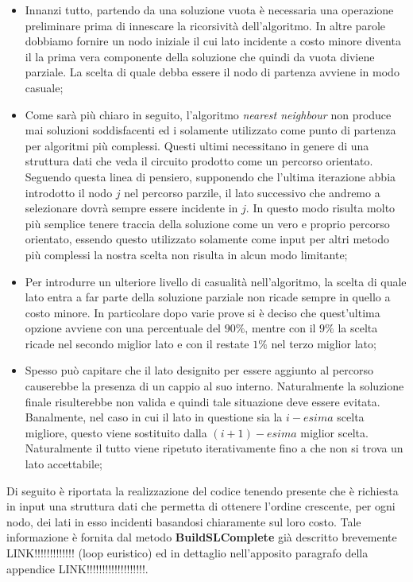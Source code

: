 \documentclass[11pt]{article}
\begin{document}
\begin{itemize}
    \item Innanzi tutto, partendo da una soluzione vuota è necessaria una operazione preliminare prima di innescare la ricorsività dell'algoritmo. In altre parole dobbiamo fornire un nodo iniziale il cui lato incidente a costo minore diventa il la prima vera componente della soluzione che quindi da vuota diviene parziale.
    La scelta di quale debba essere il nodo di partenza avviene in modo casuale;
    \item Come sarà più chiaro in seguito, l'algoritmo \textit{nearest neighbour} non produce mai soluzioni soddisfacenti ed i solamente utilizzato come punto di partenza per algoritmi più complessi. Questi ultimi necessitano in genere di una struttura dati che veda il circuito prodotto come un percorso orientato. Seguendo questa linea di pensiero, supponendo che l'ultima iterazione abbia introdotto il nodo $j$ nel percorso parzile, il lato successivo che andremo a selezionare dovrà sempre essere incidente in $j$. In questo modo risulta molto più semplice tenere traccia della soluzione come un vero e proprio percorso orientato, essendo questo utilizzato solamente come input per altri metodo più complessi la nostra scelta non risulta in alcun modo limitante;
    \item Per introdurre un ulteriore livello di casualità nell'algoritmo, la scelta di quale lato entra a far parte della soluzione parziale non ricade sempre in quello a costo minore. In particolare dopo varie prove si è deciso che quest'ultima opzione avviene con una percentuale del $90\%$, mentre con il $9\%$ la scelta ricade nel secondo miglior lato e con il restate $1\%$ nel terzo miglior lato;
    \item Spesso può capitare che il lato designito per essere aggiunto al percorso causerebbe la presenza di un cappio al suo interno. Naturalmente la soluzione finale risulterebbe non valida e quindi tale situazione deve essere evitata. Banalmente, nel caso in cui il lato in questione sia la $i-esima$ scelta migliore, questo viene sostituito dalla $(i+1)-esima$ miglior scelta. Naturalmente il tutto viene ripetuto iterativamente fino a che non si trova un lato accettabile;
\end{itemize}

Di seguito è riportata la realizzazione del codice tenendo presente che è richiesta in input una struttura dati che permetta di ottenere l'ordine crescente, per ogni nodo, dei lati in esso incidenti basandosi chiaramente sul loro costo. Tale informazione è fornita dal metodo \textbf{BuildSLComplete} già descritto brevemente LINK!!!!!!!!!!!!! (loop euristico) ed in dettaglio nell'apposito paragrafo della appendice LINK!!!!!!!!!!!!!!!!!!!.
\end{document}
